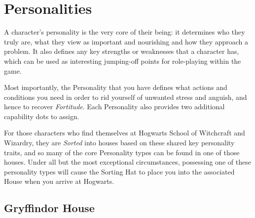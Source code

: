 \newcommand\gapText[1]
{
	~~~~~\parbox[t]{5.8 cm}{\raggedright #1}
}

\newcommand\persEntry[2]
{
	{\bf #1} & \gapText{#2} \\
}
\newcommand\personality[6]
{
	{
	\subsubsection{\key{ #1}}
	\index{Personalities!#1}
	#2
	\renewcommand{\arraystretch}{2}
	\begin{tabular}{r l }
	
	\persEntry{Bonuses}{#3}
	
	\persEntry{Assets \& Flaws}{You draw strength from #4, though your #5 often leads you into trouble. }
	
	\index{Fortitude!Regeneration}
	\persEntry{Nourishment}{You regain Fortitude whenever you #6.}
	\end{tabular}
	}
}

\chapter{Personalities}\label{C:Personality}

A character's personality is the very core of their being: it determines who they truly are, what they view as important and nourishing and how they approach a problem. It also defines any key strengths or weaknesses that a character has, which can be used as interesting jumping-off points for role-playing within the game. 

Most importantly, the Personality that you have defines what actions and conditions you need in order to rid yourself of unwanted stress and anguish, and hence to recover {\it Fortitude}. Each Personality also provides two additional capability dots to assign. 

For those characters who find themselves at Hogwarts School of Witchcraft and Wizardry, they are {\it Sorted} into houses based on these shared key personality traits, and so many of the core Personality types can be found in one of those houses. Under all but the most exceptional circumstances, possessing one of these personality types will cause the Sorting Hat to place you into the associated House when you arrive at Hogwarts. 

\section{Gryffindor House}

